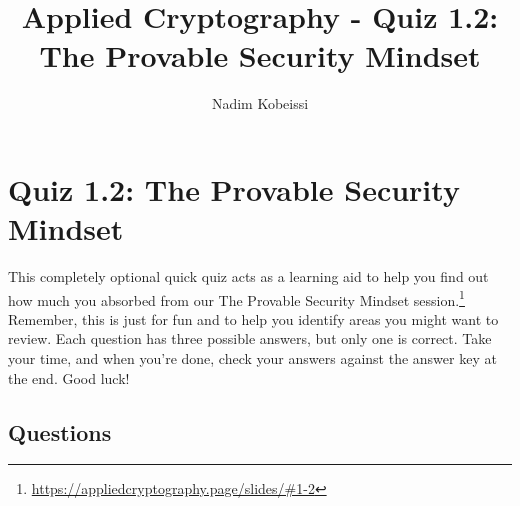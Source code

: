 \documentclass[10pt,a4paper,american]{exam}
\title{Applied Cryptography - Quiz 1.2: The Provable Security Mindset}
\author{Nadim Kobeissi}
\begin{document}
\classhandoutheader
\section*{Quiz 1.2: The Provable Security Mindset}

\begin{tcolorbox}[colframe=OliveGreen!30!white,colback=OliveGreen!5!white]
	This completely optional quick quiz acts as a learning aid to help you find out how much you absorbed from our The Provable Security Mindset session.\footnote{\url{https://appliedcryptography.page/slides/\#1-2}} Remember, this is just for fun and to help you identify areas you might want to review. Each question has three possible answers, but only one is correct. Take your time, and when you're done, check your answers against the answer key at the end. Good luck!
\end{tcolorbox}

\subsection*{Questions}
\end{document}
